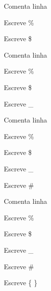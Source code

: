\begin{frame}
	\begin{description}[maiortextodomundoqueconsigoes]
		\item [{\code \%}]    Comenta linha
		\item [{\code \textbackslash \%}]    Escreve \%
		\item [{\code \textbackslash \$}]    Escreve \$
	\end{description}
\end{frame}


\begin{frame}
	\begin{description}[maiortextodomundoqueconsigoes]
		\item [{\code \%}]    Comenta linha
		\item [{\code \textbackslash \%}]    Escreve \%
		\item [{\code \textbackslash \$}]    Escreve \$
		\item [{\code \textbackslash \_}]    Escreve \_
	\end{description}
\end{frame}

\begin{frame}
	\begin{description}[maiortextodomundoqueconsigoes]
		\item [{\code \%}]    Comenta linha
		\item [{\code \textbackslash \%}]    Escreve \%
		\item [{\code \textbackslash \$}]    Escreve \$
		\item [{\code \textbackslash \_}]    Escreve \_
		\item [{\code \textbackslash \#}]    Escreve \#
	\end{description}
\end{frame}

\begin{frame}
	\begin{description}[maiortextodomundoqueconsigoes]
		\item [{\code \%}]    Comenta linha
		\item [{\code \textbackslash \%}]    Escreve \%
		\item [{\code \textbackslash \$}]    Escreve \$
		\item [{\code \textbackslash \_}]    Escreve \_
		\item [{\code \textbackslash \#}]    Escreve \#
		\item [{\code \textbackslash \{ \}}]    Escreve \{ \}
	\end{description}
\end{frame}

